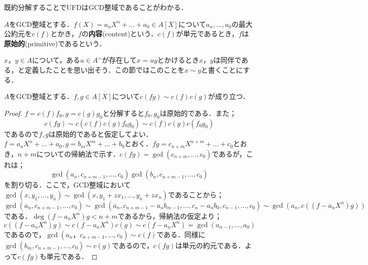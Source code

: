 既約分解することでUFDはGCD整域であることがわかる．

\begin{defi}[内容，原始多項式]
	$A$をGCD整域とする．$f(X)=a_nX^n+\dots+a_0\in A[X]$について$a_n,\dots,a_0$の最大公約元を$c(f)$とかき，$f$の\textbf{内容}(content)という．$c(f)$が単元であるとき，$f$は\textbf{原始的}(primitive)であるという．
\end{defi}

$x，y\in A$について，ある$u\in A^\times$が存在して$x=uy$とかけるとき$x，y$は同伴である，と定義したことを思い出そう．この節ではこのことを$x\sim y$と書くことにする．
\begin{lem}[Gaussの補題]
	$A$をGCD整域とする．$f,g\in A[X]$について$c(fg)\sim c(f)c(g)$が成り立つ．
\end{lem}

\begin{proof}
	$f=c(f)f_0,g=c(g)g_0$と分解すると$f_0,g_0$は原始的である．また；
	\[c(fg)\sim c(c(f)c(g)f_0g_0)\sim c(f)c(g)c(f_0g_0)\]
	であるので$f,g$は原始的であると仮定してよい．$f=a_nX^n+\dots+a_0,g=b_mX^m+\dots+b_0$とおく．$fg=c_{n+m}X^{n+m}+\dots+c_0$とおき，$n+m$についての帰納法で示す．$c(fg)=\gcd(c_{n+m},\dots,c_0)$であるが，これは；
	\[\gcd(a_n,c_{n+m-1},\dots, c_0)\gcd(b_n,c_{n+m-1},\dots,c_0)\]
	を割り切る．ここで，GCD整域において$\gcd(x,y_1,\dots,y_n)\sim\gcd(x,y_1+zx_1,\dots,y_n+zx_n)$であることから；
	\[\gcd(a_n,c_{n+m-1},\dots,c_0)\sim\gcd(a_n,c_{n+m-1}-a_nb_{m-1},\dots,c_n-a_nb_0,c_{n-1},\dots,c_0)\sim\gcd(a_n, c((f-a_nX^n)g))\]
	である．$\deg(f-a_nX^n)g<n+m$であるから，帰納法の仮定より；
	\[c((f-a_nX^n)g)\sim c(f-a_nX^n)c(g)\sim c(f-a_nX^n)=\gcd(a_{n-1},\dots,a_0)\]
	であるので，$\gcd(a_n，c_{n+m-1},\dots,c_0)\sim c(f)$である．同様に$\gcd(b_m,c_{n+m-1},\dots,c_0)\sim c(g)$であるので，$c(fg)$は単元の約元である．よって$c(fg)$も単元である．
\end{proof}

%

